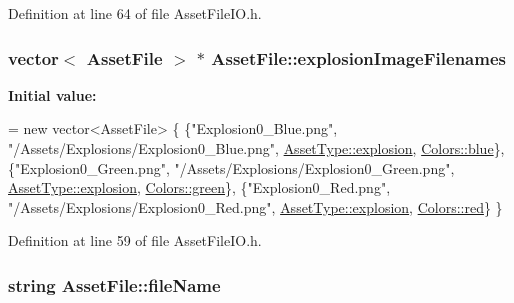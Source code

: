 Definition at line 64 of file Asset\-File\-I\-O.\-h.

\hypertarget{struct_asset_file_a71a63898ce62bf0afc9fc1e8736cfb1d}{
\subsubsection[{explosion\-Image\-Filenames}]{\setlength{\rightskip}{0pt plus 5cm}vector$<$ {\bf Asset\-File} $>$ $\ast$ Asset\-File\-::explosion\-Image\-Filenames\hspace{0.3cm}{\ttfamily [static]}}}\label{struct_asset_file_a71a63898ce62bf0afc9fc1e8736cfb1d}
{\bfseries Initial value\-:}
\begin{DoxyCode}
= \textcolor{keyword}{new} vector<AssetFile> \{
    \{\textcolor{stringliteral}{"Explosion0\_Blue.png"},     \textcolor{stringliteral}{"/Assets/Explosions/Explosion0\_Blue.png"},       
      \hyperlink{_asset_file_i_o_8h_a72d924d1cb8e1544b6d5198e98d52ca9a0f90cac94bfd7222b85c4114d122c5ac}{AssetType::explosion}, \hyperlink{_character_data_8h_a55ecd4f2ec2ebfe8d5b0163e4ac2a967a48d6215903dff56238e52e8891380c8f}{Colors::blue}\},
    \{\textcolor{stringliteral}{"Explosion0\_Green.png"},    \textcolor{stringliteral}{"/Assets/Explosions/Explosion0\_Green.png"},      
      \hyperlink{_asset_file_i_o_8h_a72d924d1cb8e1544b6d5198e98d52ca9a0f90cac94bfd7222b85c4114d122c5ac}{AssetType::explosion}, \hyperlink{_character_data_8h_a55ecd4f2ec2ebfe8d5b0163e4ac2a967a9f27410725ab8cc8854a2769c7a516b8}{Colors::green}\},
    \{\textcolor{stringliteral}{"Explosion0\_Red.png"},      \textcolor{stringliteral}{"/Assets/Explosions/Explosion0\_Red.png"},        
      \hyperlink{_asset_file_i_o_8h_a72d924d1cb8e1544b6d5198e98d52ca9a0f90cac94bfd7222b85c4114d122c5ac}{AssetType::explosion}, \hyperlink{_character_data_8h_a55ecd4f2ec2ebfe8d5b0163e4ac2a967abda9643ac6601722a28f238714274da4}{Colors::red}\}
\}
\end{DoxyCode}


Definition at line 59 of file Asset\-File\-I\-O.\-h.

\hypertarget{struct_asset_file_a6d2915fb2e781c162752036028bf9b32}{
\subsubsection[{file\-Name}]{\setlength{\rightskip}{0pt plus 5cm}string Asset\-File\-::file\-Name}}\label{struct_asset_file_a6d2915fb2e781c162752036028bf9b32}


